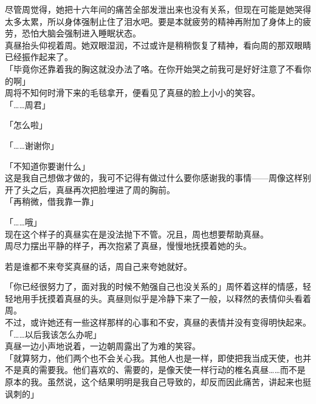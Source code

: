尽管周觉得，她把十六年间的痛苦全部发泄出来也没有关系，但现在可能是她哭得太多太累，所以身体强制止住了泪水吧。要是本就疲劳的精神再附加了身体上的疲劳，恐怕大脑会强制进入睡眠状态。\\

真昼抬头仰视着周。她双眼湿润，不过或许是稍稍恢复了精神，看向周的那双眼睛已经振作起来了。\\

「毕竟你还靠着我的胸这就没办法了咯。在你开始哭之前我可是好好注意了不看你的啊」\\

周将不知何时滑下来的毛毯拿开，便看见了真昼的脸上小小的笑容。\\

「……周君」

「怎么啦」

「……谢谢你」

「不知道你要谢什么」\\

这是我自己想做才做的，我可不记得有做过什么要你感谢我的事情——周像这样别开了头之后，真昼再次把脸埋进了周的胸前。\\

「再稍微，借我靠一靠」

「……哦」\\

现在这个样子的真昼实在是没法抛下不管。况且，周也想要帮助真昼。\\

周尽力摆出平静的样子，再次抱紧了真昼，慢慢地抚摸着她的头。

若是谁都不来夸奖真昼的话，周自己来夸她就好。

「你已经很努力了，面对我的时候不勉强自己也没关系的」周怀着这样的情感，轻轻地用手抚摸着真昼的头。真昼则似乎是冷静下来了一般，以释然的表情仰头看着周。\\

不过，或许她还有一些这样那样的心事和不安，真昼的表情并没有变得明快起来。\\

「……以后我该怎么办呢」\\

真昼一边小声地说着，一边朝周露出了为难的笑容。\\

「就算努力，他们两个也不会关心我。其他人也是一样，即使把我当成天使，也并不是真的需要我。他们喜欢的、需要的，是像天使一样行动的椎名真昼……而不是原本的我。虽然说，这个结果明明是我自己导致的，却反而因此痛苦，讲起来也挺讽刺的」\\

